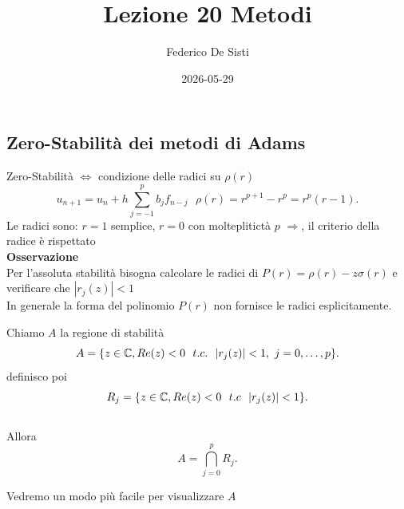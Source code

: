 \documentclass[12px]{article}
\title{Lezione 20 Metodi}
\date{2026-05-29}
\author{Federico De Sisti}
\begin{document}
	\maketitle
	\newpage
	\subsection{Zero-Stabilità dei metodi di Adams}
	Zero-Stabilità $ \Leftrightarrow$ condizione delle radici su $\rho(r)$\\
	 \[
		 u_{n+1} = u_n + h \sum^{p}_{j=-1}b_j f_{n-j} \ \ \ \rho(r) = r^{p+1} - r^p = r^p(r-1)
	.\] 
	Le radici sono: $r=1$ semplice,  $r=0$ con molteplitictà $p$ $ \Rightarrow  $, il criterio della radice è rispettato\\
	\textbf{Osservazione}\\
	Per l'assoluta stabilità bisogna calcolare le radici di  $P(r) = \rho(r) - z\sigma(r)$ e verificare che  $|r_j(z)|<1$\\
	In generale la forma del polinomio $P(r)$ non fornisce le radici esplicitamente.\\
	\begin{defi}
		Chiamo $A$ la regione di stabilità
		 \[
			 A = \{z\in \mathbb{C},Re(z) < 0 \ \ t.c.\ \ |r_j(z)| < 1, \ j = 0,\ldots, p\}
		.\] 
		definisco poi
		\[
			R_j = \{z\in \mathbb{C}, Re(z) < 0 \ \ t.c\ \ |r_j(z)| < 1\}
		.\] \\
		Allora
		 \[
			 A = \bigcap^p_{j=0}R_j
		.\] 
	\end{defi}
	Vedremo un modo più facile per visualizzare $A$
\end{document}
